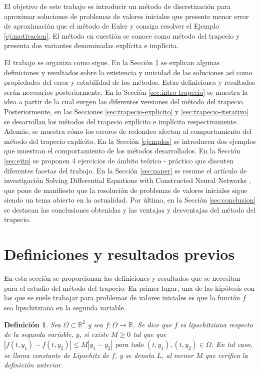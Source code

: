 \documentclass{article}
\theoremstyle{theorem-style}  %
\theoremstyle{definition-style}
\newtheorem{definition}{Definición}[section]
\theoremstyle{example-style}
\begin{document}
	El objetivo de este trabajo es introducir un método de discretización para aproximar soluciones de problemas de valores iniciales que presente menor error de aproximación que el método de Euler y consiga resolver el Ejemplo \ref{ej:motivacion}. El método en cuestión se conoce como método del trapecio y presenta dos variantes denominadas explícita e implícita.

	El trabajo se organiza como sigue. En la Sección \ref{sec:previo} se explican algunas definiciones y resultados sobre la existencia y unicidad de las soluciones así como propiedades del error y estabilidad de los métodos. Estas definiciones y resultados serán necesarios posteriormente. En la Sección \ref{sec:intro-trapecio} se muestra la idea a partir de la cual surgen las diferentes versiones del método del trapecio. Posteriormente, en las Secciones \ref{sec:trapecio-explicito} y \ref{sec:trapecio-iterativo} se desarrollan los métodos del trapecio explícito e implícito respectivamente. Además, se muestra cómo los errores de redondeo afectan al comportamiento del método del trapecio explícito. En la Sección \ref{ejemplos} se introducen dos ejemplos que muestran el comportamiento de los métodos desarrollados. En la Sección  \ref{sec:ejtp} se proponen 4 ejercicios de ámbito teórico - práctico que discuten diferentes facetas del trabajo. En la Sección \ref{sec:paper} se resume el artículo de investigación Solving Differential Equations with Constructed Neural Networks \cite{nn-de}, que pone de manifiesto que la resolución de problemas de valores iniciales sigue siendo un tema abierto en la actualidad. Por último, en la Sección \ref{sec:conclusion} se destacan las conclusiones obtenidas y las ventajas y desventajas del método del trapecio.

\section{Definiciones y resultados previos} \label{sec:previo}

	En esta sección se proporcionan las definiciones y resultados que se necesitan para el estudio del método del trapecio. En primer lugar, una de las hipótesis con las que se suele trabajar para problemas de valores iniciales es que la función $f$ sea lipschitziana en la segunda variable.

	\begin{definition}
		Sea $\Omega \subset \mathbb{R}^2$ y sea $f : \Omega \rightarrow \mathbb{R}$. Se dice que $f$ es lipschitziana respecto de la segunda variable, $y$, si existe $M \ge 0$ tal que que $|f(t,y_1) - f(t, y_2)| \le M|y_1 - y_2|$ para todo $(t,y_1), (t,y_2) \in \Omega$. En tal caso, se llama constante de Lipschitz de $f$, y se denota $L$, al menor $M$ que verifica la definición anterior.
	\end{definition}
\end{document}
